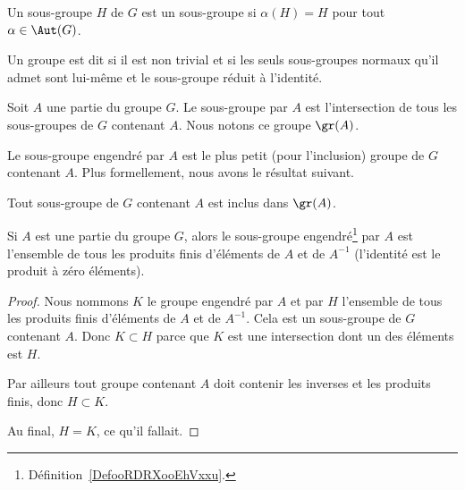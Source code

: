\begin{definition}      \label{DEFooUXXTooCCLmQe}
    Un sous-groupe \( H\) de \( G\) est un sous-groupe  si \( \alpha(H)=H\) pour tout \( \alpha\in \Aut(G)\).
\end{definition}

\begin{definition}   \label{DefGroupeSimple}
    Un groupe est dit  si il est non trivial et si les seuls sous-groupes normaux qu'il admet sont lui-même et le sous-groupe réduit à l'identité.
\end{definition}

\begin{definition}        \label{DefooRDRXooEhVxxu}
    Soit \( A\) une partie du groupe \( G\). Le sous-groupe  par \( A\) est l'intersection de tous les sous-groupes de \( G\) contenant \( A\). Nous notons ce groupe \( \gr(A)\).
\end{definition}

Le sous-groupe engendré par \( A \) est le plus petit (pour l'inclusion) groupe de \( G\) contenant \( A\). Plus formellement, nous avons le résultat suivant.
\begin{lemma}
    Tout sous-groupe de \( G\) contenant \( A\) est inclus dans \( \gr(A)\).
\end{lemma}


\begin{lemma}   \label{LemFUIZooBZTCiy}
    Si \( A\) est une partie du groupe \( G\), alors le sous-groupe engendré\footnote{Définition~\ref{DefooRDRXooEhVxxu}.} par \( A\) est l'ensemble de tous les produits finis d'éléments de \( A\) et de \( A^{-1}\) (l'identité est le produit à zéro éléments).
\end{lemma}

\begin{proof}
    Nous nommons \( K\) le groupe engendré par \( A\) et par \( H\) l'ensemble de tous les produits finis d'éléments de \( A\) et de \( A^{-1}\). Cela est un sous-groupe de \( G\) contenant \( A\). Donc \( K\subset H\) parce que \( K\) est une intersection dont un des éléments est \( H\).

    Par ailleurs tout groupe contenant \( A\) doit contenir les inverses et les produits finis, donc \( H\subset K\).

    Au final, \( H=K\), ce qu'il fallait.
\end{proof}


